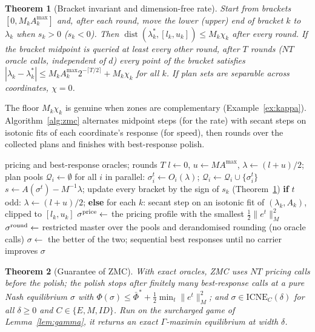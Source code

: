 \documentclass[preprint,12pt]{elsarticle}
\newtheorem{theorem}{Theorem}
\theoremstyle{definition}
\theoremstyle{remark}
\newcommand{\Amax}{A^{\max}}
\newcommand{\ICNE}{\mathrm{ICNE}}
\begin{document}
\begin{theorem}[Bracket invariant and dimension-free rate]\label{thm:bracket}
Start from brackets $[0,M_k\Amax_k]$ and, after each round, move the lower (upper) end of bracket $k$ to $\lambda_k$ when $s_k>0$ ($s_k<0$). Then $\operatorname{dist}(\lambda^*_k,[l_k,u_k])\le M_k\chi_k$ after every round. If the bracket midpoint is queried at least every other round, after $T$ rounds ($NT$ oracle calls, independent of $d$) every point of the bracket satisfies $|\lambda_k-\lambda^*_k|\le M_k\Amax_k2^{-\lceil T/2\rceil}+M_k\chi_k$ for all $k$. If plan sets are separable across coordinates, $\chi=0$.
\end{theorem}

The floor $M_k\chi_k$ is genuine when zones are complementary (Example~\ref{ex:kappa}). Algorithm~\ref{alg:zmc} alternates midpoint steps (for the rate) with secant steps on isotonic fits of each coordinate's response (for speed), then rounds over the collected plans and finishes with best-response polish.

\begin{algorithm}[t]
\caption{ZMC: zone-market clearing for pure equilibria of the D1 game}\label{alg:zmc}
\begin{algorithmic}[1]
\Require pricing and best-response oracles; rounds $T$
\State $l\gets0$, $u\gets M\Amax$, $\lambda\gets(l+u)/2$; plan pools $\mathcal Q_i\gets\emptyset$
 \State for all $i$ in parallel: $\sigma^t_i\gets O_i(\lambda)$; $\mathcal Q_i\gets\mathcal Q_i\cup\{\sigma^t_i\}$ 
 \State $s\gets A(\sigma^t)-M^{-1}\lambda$; update every bracket by the sign of $s_k$ (Theorem~\ref{thm:bracket})
 \State \textbf{if} $t$ odd: $\lambda\gets(l+u)/2$; \textbf{else} for each $k$: secant step on an isotonic fit of $(\lambda_k,A_k)$, clipped to $[l_k,u_k]$
\EndFor
\State $\sigma^{\rm price}\gets$ the pricing profile with the smallest $\tfrac12\|e^t\|_M^2$
\State $\sigma^{\rm round}\gets$ restricted master over the pools and derandomised rounding (no oracle calls)
\State $\sigma\gets$ the better of the two; sequential best responses until no carrier improves
\State \Return $\sigma$
\end{algorithmic}
\end{algorithm}

\begin{theorem}[Guarantee of ZMC]\label{thm:zmc}
With exact oracles, ZMC uses $NT$ pricing calls before the polish; the polish stops after finitely many best-response calls at a pure Nash equilibrium $\sigma$ with $\Phi(\sigma)\le\bar\Phi^*+\tfrac12\min_t\|e^t\|_M^2$; and $\sigma\in\ICNE_C(\delta)$ for all $\delta\ge0$ and $C\in\{E,M,ID\}$. Run on the surcharged game of Lemma~\ref{lem:gamma}, it returns an exact $\Gamma$-maximin equilibrium at width $\delta$.
\end{theorem}
\end{document}
